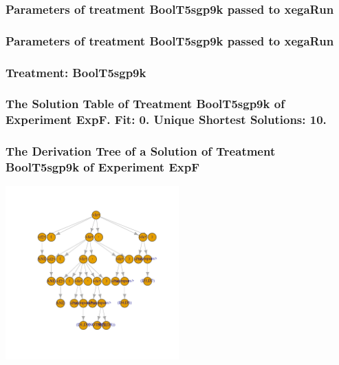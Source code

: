 \documentclass[18pt,c]{beamer}
\begin{document}

 \begin{frame}
 \fontsize{8pt}{9pt}\selectfont
 \frametitle{  Parameters of treatment BoolT5sgp9k passed to xegaRun
 }

 \label{ExpFtParmTable042.tex}  
 \end{frame}


 \begin{frame}
 \fontsize{8pt}{9pt}\selectfont
 \frametitle{  Parameters of treatment BoolT5sgp9k passed to xegaRun
 }

 \label{ExpFtParmTable043.tex}  
 \end{frame}

 \begin{frame}
 \fontsize{8pt}{9pt}\selectfont
 \frametitle{ Treatment: BoolT5sgp9k }

 \label{ExpFStatsTable016.tex}  
 \end{frame}

 \begin{frame}
 \fontsize{8pt}{9pt}\selectfont
 \frametitle{ The Solution Table of Treatment BoolT5sgp9k of Experiment ExpF. Fit: 0. Unique Shortest Solutions: 10. }

 \label{ExpFSolutionTable010.tex}  
 \end{frame}

 \begin{frame}
 \frametitle{ The Derivation Tree of a Solution of Treatment BoolT5sgp9k of Experiment ExpF }
 \begin{center}
\includegraphics[width=0.5\textwidth, angle=0]
{ExpFDerivationTreeFigure010.pdf}
 \end{center}
 \label{report/ExpFDerivationTreeFigure010.pdf}  
 \end{frame}
\end{document}
